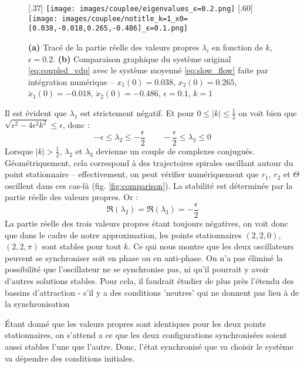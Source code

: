 %
\begin{figure}
    \centering
    \subcaptionbox{}[.37\linewidth]{%
        \texttt{[image: images/couplee/eigenvalues\_ϵ=0.2.png]}%
        \label{fig:eigenvals}
    }
    \hfill
    \subcaptionbox{}[.60\linewidth]{%
        \texttt{[image: images/couplee/notitle\_k=1\_x0=[0.038,-0.018,0.265,-0.486]\_ϵ=0.1.png]}%
        \label{fig:comparison}
    }
    \label{fig:yeet}
    \caption{\textbf{(a)} Tracé de la partie réelle des valeurs propres $\lambda_i$ en fonction de $k$, $\epsilon=0.2$. 
        \textbf{(b)} Comparaison graphique du système original \eqref{eq:coupled_vdp} avec le système moyenné \eqref{eq:slow_flow} faite par intégration numérique – $x_1(0)=0.038$, $x_2(0)=0.265$, $\dot{x}_1(0)=-0.018$, $\dot{x}_2(0)=-0.486$, $\epsilon=0.1$, $k=1$}
    
\end{figure}
%
Il est évident que $\lambda_1$ est strictement négatif. %
Et pour $0 \leq |k| \leq \frac{1}{2} $ on voit bien que $\sqrt{\epsilon^2 - 4\epsilon^2k^2} \leq \epsilon$, donc :
\[ -\epsilon \leq \lambda_2 \leq -\frac{\epsilon}{2} \qquad -\frac{\epsilon}{2} \leq \lambda_3 \leq 0\]
%
Lorsque $|k| > \frac{1}{2}$, $\lambda_2$ et $\lambda_3$ devienne un couple de complexes conjugués. 
Géométriquement, cela correspond à des trajectoires spirales oscillant autour du point stationnaire 
– effectivement, on peut vérifier numériquement que $r_1$, $r_2$ et $\Theta$ oscillent dans ces cas-là (fig. \ref{fig:comparison}). 
La stabilité est déterminée par la partie réelle des valeurs propres. Or :
\[ \Re(\lambda_2) = \Re(\lambda_3) = -\frac{\epsilon}{2} \]
%
La partie réelle des trois valeurs propres étant toujours négatives, 
on voit donc que dans le cadre de notre approximation, les points stationnaires $(2, 2, 0)$, $(2, 2, \pi)$ sont stables pour tout $k$. 
Ce qui nous montre que les deux oscillateurs peuvent se synchroniser soit en phase ou en anti-phase. 
On n'a pas éliminé la possibilité que l'oscillateur ne se synchronise pas, ni qu'il pourrait y avoir d'autres solutions stables. 
Pour cela, il faudrait étudier de plus près l'étendu des bassins d'attraction - s'il y a des conditions 'neutres' 
qui ne donnent pas lieu à de la synchronisation

Étant donné que les valeurs propres sont identiques pour les deux points stationnaires, 
on s'attend a ce que les deux configurations synchronisées soient aussi stables l'une que l'autre. 
Donc, l'état synchronisé que va choisir le système va dépendre des conditions initiales.